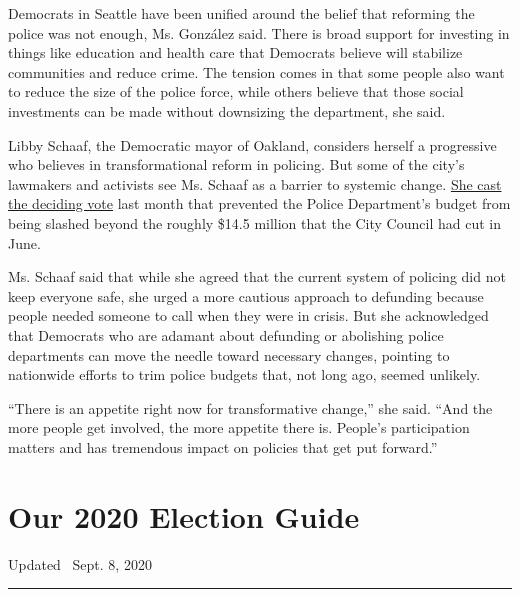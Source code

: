 Democrats in Seattle have been unified around the belief that reforming
the police was not enough, Ms. González said. There is broad support for
investing in things like education and health care that Democrats
believe will stabilize communities and reduce crime. The tension comes
in that some people also want to reduce the size of the police force,
while others believe that those social investments can be made without
downsizing the department, she said.

Libby Schaaf, the Democratic mayor of Oakland, considers herself a
progressive who believes in transformational reform in policing. But
some of the city's lawmakers and activists see Ms. Schaaf as a barrier
to systemic change.
\href{https://www.eastbaytimes.com/2020/07/22/oakland-mayor-schaaf-casts-tie-breaking-vote-to-reject-opd-cuts/}{She
cast the deciding vote} last month that prevented the Police
Department's budget from being slashed beyond the roughly \$14.5 million
that the City Council had cut in June.

Ms. Schaaf said that while she agreed that the current system of
policing did not keep everyone safe, she urged a more cautious approach
to defunding because people needed someone to call when they were in
crisis. But she acknowledged that Democrats who are adamant about
defunding or abolishing police departments can move the needle toward
necessary changes, pointing to nationwide efforts to trim police budgets
that, not long ago, seemed unlikely.

``There is an appetite right now for transformative change,'' she said.
``And the more people get involved, the more appetite there is. People's
participation matters and has tremendous impact on policies that get put
forward.''

\hypertarget{our-2020-election-guide}{%
\section{Our 2020 Election Guide}\label{our-2020-election-guide}}

Updated ~Sept. 8, 2020

\begin{center}\rule{0.5\linewidth}{\linethickness}\end{center}

